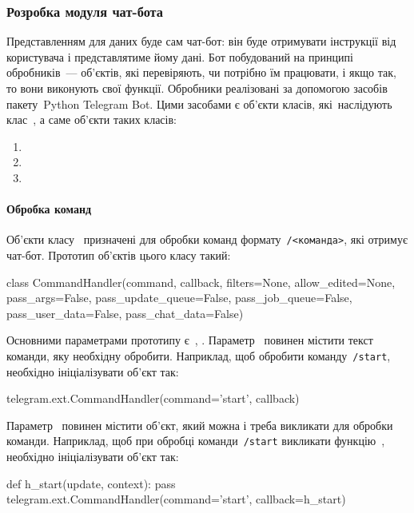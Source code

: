 \documentclass[
	a4paper,
	oneside,
	BCOR = 10mm,
	DIV = 12,
	12pt,
	headings = normal,
]{scrartcl}
\begin{document}
			\subsubsection{Розробка модуля чат-бота}
				Представленням для даних буде сам чат-бот: він буде отримувати інструкції від користувача і представлятиме йому дані. Бот побудований на принципі обробників~— об'єктів, які перевіряють, чи потрібно їм працювати, і якщо так, то вони виконують свої функції. Обробники реалізовані за допомогою засобів пакету~\textenglish{Python Telegram Bot}. Цими засобами є об'єкти класів, які~наслідують клас~, а саме об'єкти таких класів:
				\begin{enumerate}
					\item {}
					\item {}
					\item {}
				\end{enumerate}

				\paragraph{Обробка команд}
				Об'єкти класу~ призначені для обробки команд формату~\verb|/<команда>|, які отримує чат-бот. Прототип об'єктів цього класу такий:
				\begin{pythoncode}
					class CommandHandler(command, callback, filters=None, allow_edited=None, pass_args=False, pass_update_queue=False, pass_job_queue=False, pass_user_data=False, pass_chat_data=False)
				\end{pythoncode}
				Основними параметрами прототипу є~, . Параметр~ повинен містити текст команди, яку необхідну обробити. Наприклад, щоб обробити команду~\verb|/start|, необхідно ініціалізувати об'єкт так:
				\begin{pythoncode}
					telegram.ext.CommandHandler(command='start', callback)
				\end{pythoncode}
				Параметр~ повинен містити об'єкт, який можна і треба викликати для обробки команди. Наприклад, щоб при обробці команди~\verb|/start| викликати функцію~, необхідно ініціалізувати об'єкт так:
				\begin{pythoncode}
					def h_start(update, context):
					    pass
					telegram.ext.CommandHandler(command='start', callback=h_start)
				\end{pythoncode}
\end{document}

